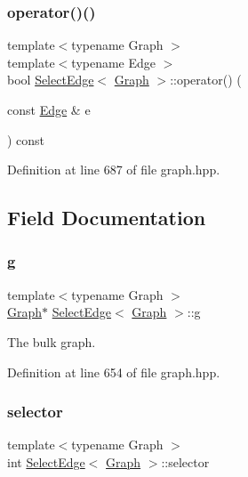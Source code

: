 \subsubsection{\texorpdfstring{operator()()}{operator()()}}
{\footnotesize\ttfamily template$<$typename Graph $>$ \\
template$<$typename Edge $>$ \\
bool \hyperlink{structSelectEdge}{Select\+Edge}$<$ \hyperlink{structGraph}{Graph} $>$\+::operator() (\begin{DoxyParamCaption}\item[{const \hyperlink{structEdge}{Edge} \&}]{e }\end{DoxyParamCaption}) const\hspace{0.3cm}{\ttfamily [inline]}}



Definition at line 687 of file graph.\+hpp.



\subsection{Field Documentation}
\mbox{\label{structSelectEdge_abf6c83f5f1757c9a5629b0228034e6fd}} 
\subsubsection{\texorpdfstring{g}{g}}
{\footnotesize\ttfamily template$<$typename Graph $>$ \\
\hyperlink{structGraph}{Graph}$\ast$ \hyperlink{structSelectEdge}{Select\+Edge}$<$ \hyperlink{structGraph}{Graph} $>$\+::g\hspace{0.3cm}{\ttfamily [private]}}



The bulk graph. 



Definition at line 654 of file graph.\+hpp.

\mbox{\label{structSelectEdge_a6cb7ce5372b3f4b6de11374175cc4da9}} 
\subsubsection{\texorpdfstring{selector}{selector}}
{\footnotesize\ttfamily template$<$typename Graph $>$ \\
int \hyperlink{structSelectEdge}{Select\+Edge}$<$ \hyperlink{structGraph}{Graph} $>$\+::selector\hspace{0.3cm}{\ttfamily [private]}}



